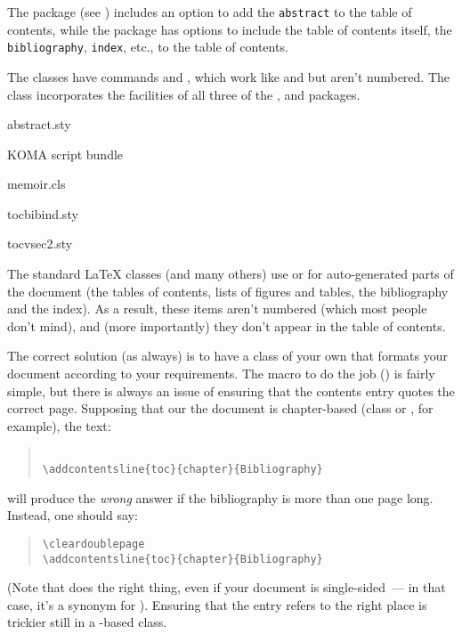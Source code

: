 The package  (see %
) includes an option
to add the \texttt{abstract} to the table of contents, while the
package  has options to include the table of
contents itself, the \texttt{bibliography}, \texttt{index}, etc., to
the table of contents.

The  classes have commands  and
, which work like  and  but
aren't numbered.  The  class incorporates the facilities
of all three of the ,  and
 packages.
\begin{ctanrefs}
\item[abstract.sty]
\item[\nothtml{\rmfamily}KOMA script bundle]
\item[memoir.cls]
\item[tocbibind.sty]
\item[tocvsec2.sty]
\end{ctanrefs}


The standard \LaTeX{} classes (and many others) use  or
 for auto-generated parts of the document (the tables of
contents, lists of figures and tables, the bibliography and the index).  As a
result, these items aren't numbered (which most people don't mind),
and (more importantly) they don't appear in the table of contents.

The correct solution (as always) is to have a class of your own that
formats your document according to your requirements.  The macro to do
the job () is fairly simple, but there is always
an issue of ensuring that the contents entry quotes the correct page.
Supposing that our the document is chapter-based (class 
or , for example), the text:
\begin{quote}
\begin{verbatim}

\addcontentsline{toc}{chapter}{Bibliography}
\end{verbatim}
\end{quote}
will produce the \emph{wrong} answer if the bibliography is more than
one page long.  Instead, one should say:
\begin{quote}
\begin{verbatim}
\cleardoublepage
\addcontentsline{toc}{chapter}{Bibliography}

\end{verbatim}
\end{quote}
(Note that  does the right thing, even if your
document is single-sided~--- in that case, it's a synonym for
).  Ensuring that the entry refers to the right place is
trickier still in a -based class.

